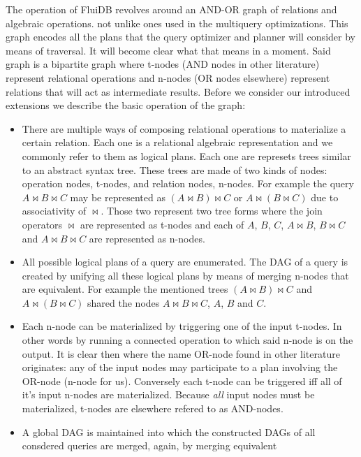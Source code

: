 The operation of FluiDB revolves around an AND-OR graph of relations
and algebraic operations. not unlike ones used in the multiquery
optimizations. This graph encodes all the plans that the query
optimizer and planner will consider by means of traversal. It will
become clear what that means in a moment. Said graph is a bipartite
graph where t-nodes (AND nodes in other literature) represent
relational operations and n-nodes (OR nodes elsewhere) represent
relations that will act as intermediate results. Before we consider
our introduced extensions we describe the basic operation of the
graph:

\begin{itemize}
\item There are multiple ways of composing relational operations to
  materialize a certain relation. Each one is a relational algebraic
  representation and we commonly refer to them as logical plans. Each
  one are represets trees similar to an abstract syntax tree. These
  trees are made of two kinds of nodes: operation nodes, t-nodes, and
  relation nodes, n-nodes. For example the query \(A \Join B \Join C\)
  may be represented as \((A \Join B) \Join C\) or
  \(A \Join (B \Join C)\) due to associativity of \(\Join\). Those two
  represent two tree forms where the join operators \(\Join\) are
  represented as t-nodes and each of \(A\), \(B\), \(C\),
  \(A \Join B\), \(B \Join C\) and \(A \Join B \Join C\) are
  represented as n-nodes.
\item All possible logical plans of a query are enumerated. The DAG of
  a query is created by unifying all these logical plans by means of
  merging n-nodes that are equivalent. For example the mentioned trees
  \((A \Join B) \Join C\) and \(A \Join (B \Join C)\) shared the nodes
  \(A \Join B \Join C\), \(A\), \(B\) and \(C\).
\item Each n-node can be materialized by triggering one of the input
  t-nodes. In other words by running a connected operation to which
  said n-node is on the output. It is clear then where the name
  OR-node found in other literature originates: any of the input nodes
  may participate to a plan involving the OR-node (n-node for
  us). Conversely each t-node can be triggered iff all of it's input
  n-nodes are materialized. Because \emph{all} input nodes must be
  materialized, t-nodes are elsewhere refered to as AND-nodes.
\item A global DAG is maintained into which the constructed DAGs of
  all consdered queries are merged, again, by merging equivalent

\end{itemize}
